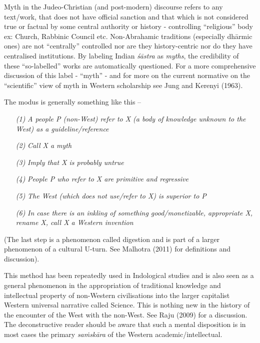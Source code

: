 Myth in the Judeo-Christian (and post-modern) discourse refers to any text/work, that does not have official sanction and that which is not considered true or factual by some central authority or history - controlling ``religious'' body ex: Church, Rabbinic Council etc. Non-Abrahamic traditions (especially dhārmic ones) are not ``centrally'' controlled nor are they history-centric nor do they have centralised institutions. By labeling Indian {\sl śāstra} as {\sl myths}, the credibility of these ``so-labelled'' works are automatically questioned. For a more comprehensive discussion of this label -  ``myth'' - and for more on the current normative on the ``scientific'' view of myth in Western scholarship see Jung and Kerenyi (1963).

The modus is generally something like this --
\begin{itemize}
\itemsep=1pt
\item[{\sl(1)}] {\sl A people P (non-West) refer to X (a body of knowledge unknown to the West) as a guideline/reference}

\item[{\sl(2)}] {\sl Call X  a myth} 

\item[{\sl(3)}] {\sl Imply that X is probably untrue}

\item[{\sl(4)}] {\sl People P who refer to X are primitive and regressive}

\item[{\sl(5)}] {\sl The West (which does not use/refer to X) is superior to P}

\item[{\sl(6)}] {\sl In case there is an inkling of something good/monetizable, appropriate X, rename X, call X a Western invention} 
\end{itemize}

(The last step is a phenomenon called digestion and is part of a larger phenomenon of a cultural U-turn. See Malhotra (2011) for definitions and discussion).

This method has been repeatedly used in Indological studies and is also seen as a general phenomenon in the appropriation of traditional knowledge and intellectual property of non-Western civilisations into the larger capitalist Western universal narrative called Science. This is nothing new in the history of the encounter of the West with the non-West. See Raju (2009) for a discussion. The deconstructive reader should be aware that such a mental disposition is in most cases the primary {\sl saṁskāra} of the Western academic/intellectual.

